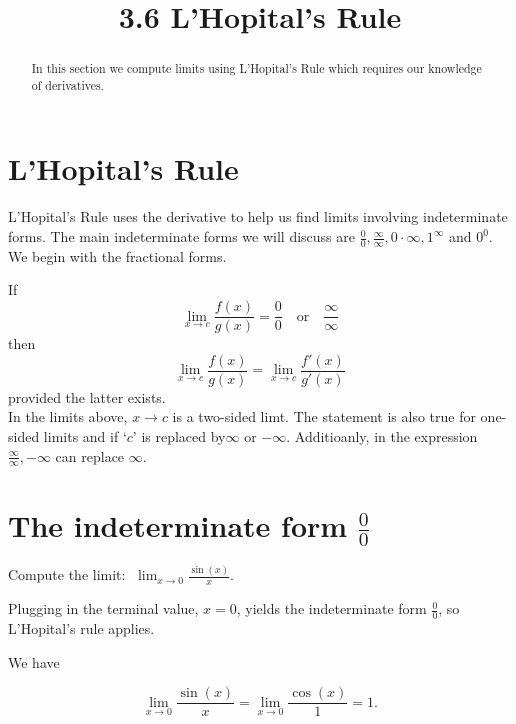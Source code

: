 \documentclass{ximera}
\title{3.6 L'Hopital's Rule}
\begin{document}
\begin{abstract}
In this section we compute limits using L'Hopital's Rule which requires our knowledge of derivatives.
\end{abstract}

\maketitle

\section{L'Hopital's Rule}

L'Hopital's Rule uses the derivative to help us find limits involving indeterminate forms. 
The main indeterminate forms we will discuss are $\frac 00, \frac{\infty}{\infty}, 0\cdot \infty, 1^\infty$ and $0^0$. We begin with the fractional forms.

\begin{theorem}




If 
\[
\lim_{x \to c} \frac{f(x)}{g(x)} = \frac{0}{0} \quad \text{or} \quad \frac{\infty}{\infty}
\]
then \[\lim_{x \to c} \frac{f(x)}{g(x)} = \lim_{x \to c} \frac{f'(x)}{g'(x)}\]
 provided the latter exists.\\
In the limits above, $x \to c$ is a two-sided limt.  The statement is also true for one-sided limits and if `$c$' is replaced by$\infty$ or $-\infty$.
Additioanly, in the expression $\frac{\infty}{\infty}, -\infty$ can replace $\infty$.
\end{theorem}



\section{The indeterminate form $\frac00$}


\begin{example}[example 1]
Compute the limit: $\displaystyle{\;\lim_{x \to 0} \frac{\sin(x)}{x}}.$

Plugging in the terminal value, $x=0$, yields 
the indeterminate form $\frac00$, so L'Hopital's rule applies.

We have 

\[\lim_{x \to 0} \frac{\sin(x)}{x} = \lim_{x \to 0} \frac{\cos(x)}{1} = 1.\]
\end{example}
\end{document}
